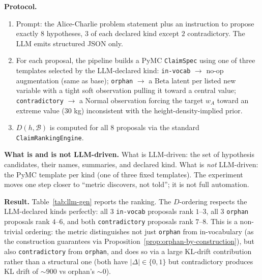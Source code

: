 \documentclass{article}
\begin{document}
\textbf{Protocol.}
\begin{enumerate}[leftmargin=*, itemsep=0pt]
\item Prompt: the Alice-Charlie problem statement plus an instruction
to propose exactly $8$ hypotheses, $3$ of each declared kind except
$2$ contradictory. The LLM emits structured JSON only.
\item For each proposal, the pipeline builds a PyMC \texttt{ClaimSpec}
using one of three templates selected by the LLM-declared kind:
\texttt{in-vocab} $\to$ no-op augmentation (same as base);
\texttt{orphan} $\to$ a $\mathrm{Beta}$ latent per listed new variable
with a tight soft observation pulling it toward a central value;
\texttt{contradictory} $\to$ a Normal observation forcing the target
$w_{A}$ toward an extreme value ($30$ kg) inconsistent with the
height-density-implied prior.
\item $D(h, \mathcal{B})$ is computed for all $8$ proposals via the
standard \texttt{ClaimRankingEngine}.
\end{enumerate}

\textbf{What is and is not LLM-driven.} What is LLM-driven: the set of
hypothesis candidates, their names, summaries, and declared kind. What
is \emph{not} LLM-driven: the PyMC template per kind (one of three
fixed templates). The experiment moves one step closer to
``metric discovers, not told''; it is not full automation.

\textbf{Result.} Table~\ref{tab:llm-gen} reports the ranking. The
$D$-ordering respects the LLM-declared kinds perfectly: all $3$
\texttt{in-vocab} proposals rank $1$--$3$, all $3$ \texttt{orphan}
proposals rank $4$--$6$, and both \texttt{contradictory} proposals
rank $7$--$8$. This is a non-trivial ordering: the metric
distinguishes not just \texttt{orphan} from in-vocabulary (as the
construction guarantees via Proposition~\ref{prop:orphan-by-construction}),
but also \texttt{contradictory} from \texttt{orphan}, and does so via
a large KL-drift contribution rather than a structural one (both
have $|\Delta| \in \{0, 1\}$ but contradictory produces KL drift of
$\sim 900$ vs orphan's $\sim 0$).
\end{document}
